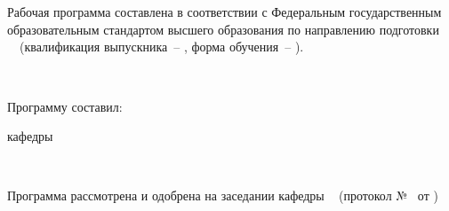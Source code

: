 \chapter*{}							
Рабочая программа составлена в соответствии с Федеральным государственным образовательным стандартом высшего образования по направлению подготовки \SpecialityCode~\SpecialityName~(квалификация выпускника~-- \Qualification, форма обучения~-- \FormOfStudy).

~\par

Программу составил:\par
\AuthorPost \par кафедры
\AuthorDepartment \hfill \AuthorName

~\par

Программа рассмотрена и одобрена на заседании кафедры \AuthorDepartment~  (протокол №\ProtocolNumber~ от \ProtocolDate)

~\par

\DepartmentHead \par
\AuthorDepartment \par
\HeadPost \hfill \HeadName




